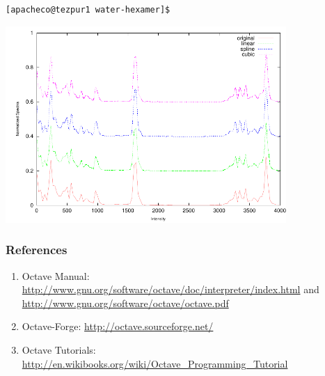 \documentclass[slidestop,mathserif,compress,xcolor=svgnames]{beamer}
\begin{document}
\begin{frame}
\begin{itemize}
{\begin{verbatim}
[apacheco@tezpur1 water-hexamer]$
    \end{verbatim}
  }
  \end{itemize}
  \begin{center}
    \includegraphics[width=0.8\textwidth]{./spectra}
  \end{center}
\end{frame}

\begin{frame}
  \frametitle{\small References}
  \begin{enumerate}
    \item Octave Manual: \url{http://www.gnu.org/software/octave/doc/interpreter/index.html} and \url{http://www.gnu.org/software/octave/octave.pdf}
    \item Octave-Forge: \url{http://octave.sourceforge.net/}
    \item Octave Tutorials: \url{http://en.wikibooks.org/wiki/Octave_Programming_Tutorial}
  \end{enumerate}
\end{frame}
\end{document}
